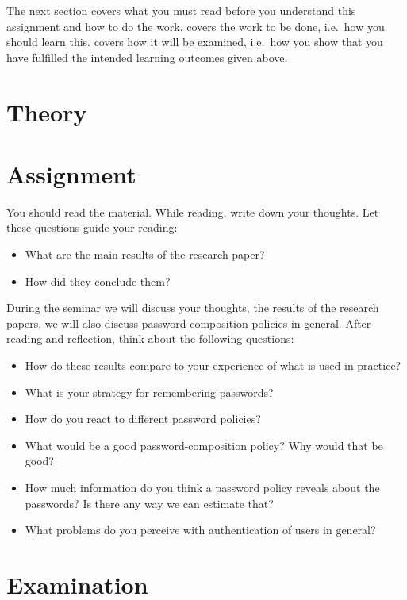 The next section covers what you must read before you understand this 
assignment and how to do the work.
 covers the work to be done, i.e.~how you should learn this.
 covers how it will be examined, i.e.~how you show that you have 
fulfilled the intended learning outcomes given above.


\section{Theory}
\label{sec:theory}



\section{Assignment}
\label{sec:tasks}
You should read the material.
While reading, write down your thoughts.
Let these questions guide your reading:
\begin{itemize}
  \item What are the main results of the research paper?
  \item How did they conclude them?
\end{itemize}

During the seminar we will discuss your thoughts, the results of the research 
papers, we will also discuss password-composition policies in general.
After reading and reflection, think about the following questions:
\begin{itemize}
  \item How do these results compare to your experience of what is used in 
    practice?
  \item What is your strategy for remembering passwords?
  \item How do you react to different password policies?
  \item What would be a good password-composition policy?
    Why would that be good?
  \item How much information do you think a password policy reveals about the 
    passwords?
    Is there any way we can estimate that?
  \item What problems do you perceive with authentication of users in general?
\end{itemize}


\section{Examination}
\label{sec:exam}

